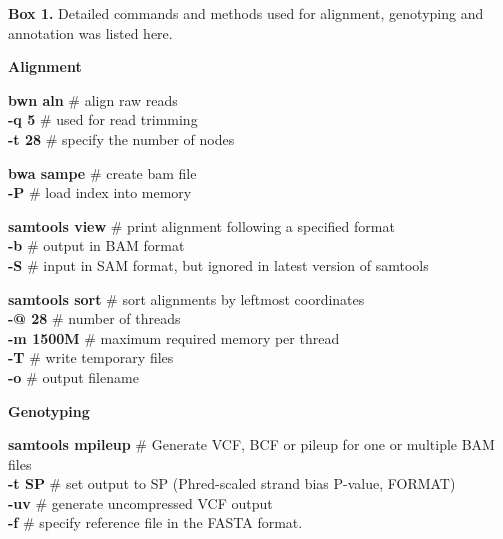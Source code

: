 \documentclass[a4paper, 12pt]{article}
\begin{document}
		\newpage
			\begin{tcolorbox}
				\textbf{Box 1.} Detailed commands and methods used for alignment, genotyping and annotation was listed here.
				
				\textbf{Alignment}
				
				\setlength{\hangindent}{2em}
				\textbf{bwn aln} \hfill \# align raw reads
				\\\textbf{-q 5} \hfill \# used for read trimming
				\\\textbf{-t 28} \hfill \# specify the number of nodes
				
				\vspace*{1\baselineskip}
				\setlength{\hangindent}{2em}
				\textbf{bwa sampe} \hfill \# create bam file
				\\\textbf{-P} \hfill \# load index into memory
				
				\vspace*{1\baselineskip}
				\setlength{\hangindent}{2em}
				\textbf{samtools view} \hfill \# print alignment following a specified format
				\\\textbf{-b} \hfill \# output in BAM format
				\\\textbf{-S} \hfill \# input in SAM format, but ignored in latest version of samtools
				
				\vspace*{1\baselineskip}
				\setlength{\hangindent}{2em}
				\textbf{samtools sort} \hfill \# sort alignments by leftmost coordinates
				\\\textbf{-@ 28} \hfill \# number of threads
				\\\textbf{-m 1500M} \hfill \# maximum required memory per thread
				\\\textbf{-T} \hfill \# write temporary files
				\\\textbf{-o} \hfill \# output filename
				
				\vspace*{1\baselineskip}
				\textbf{Genotyping}
				
				\setlength{\hangindent}{2em}
				\textbf{samtools mpileup} \hfill \# Generate VCF, BCF or pileup for one or multiple BAM files
				\\\textbf{-t SP} \hfill \# set output to SP (Phred-scaled strand bias P-value, FORMAT)
				\\\textbf{-uv} \hfill \# generate uncompressed VCF output
				\\\textbf{-f} \hfill \# specify reference file in the FASTA format.
				

\end{tcolorbox}
\end{document}
